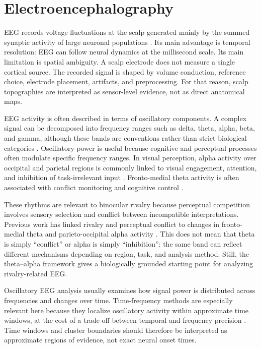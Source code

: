 \documentclass[11pt,a4paper,chapterprefix=false,parskip=false]{scrreprt}
\begin{document}
\section{Electroencephalography}
EEG records voltage fluctuations at the scalp generated mainly by the summed synaptic activity of large neuronal populations \citep{biasiucci_electroencephalography_2019, nunez_electric_2006}. Its main advantage is temporal resolution: EEG can follow neural dynamics at the millisecond scale. Its main limitation is spatial ambiguity. A scalp electrode does not measure a single cortical source. The recorded signal is shaped by volume conduction, reference choice, electrode placement, artifacts, and preprocessing. For that reason, scalp topographies are interpreted as sensor-level evidence, not as direct anatomical maps.

EEG activity is often described in terms of oscillatory components. A complex signal can be decomposed into frequency ranges such as delta, theta, alpha, beta, and gamma, although these bands are conventions rather than strict biological categories \citep{cohen_analyzing_2014}. Oscillatory power is useful because cognitive and perceptual processes often modulate specific frequency ranges. In visual perception, alpha activity over occipital and parietal regions is commonly linked to visual engagement, attention, and inhibition of task-irrelevant input \citep{torralba_cuello_alpha_2022}. Fronto-medial theta activity is often associated with conflict monitoring and cognitive control \citep{drew_conflict_2022}.

These rhythms are relevant to binocular rivalry because perceptual competition involves sensory selection and conflict between incompatible interpretations. Previous work has linked rivalry and perceptual conflict to changes in fronto-medial theta and parieto-occipital alpha activity \citep{drew_conflict_2022, drew_binocular_2026}. This does not mean that theta is simply ``conflict'' or alpha is simply ``inhibition'': the same band can reflect different mechanisms depending on region, task, and analysis method. Still, the theta--alpha framework gives a biologically grounded starting point for analyzing rivalry-related EEG.

Oscillatory EEG analysis usually examines how signal power is distributed across frequencies and changes over time. Time-frequency methods are especially relevant here because they localize oscillatory activity within approximate time windows, at the cost of a trade-off between temporal and frequency precision \citep{cohen_analyzing_2014}. Time windows and cluster boundaries should therefore be interpreted as approximate regions of evidence, not exact neural onset times.
\end{document}
